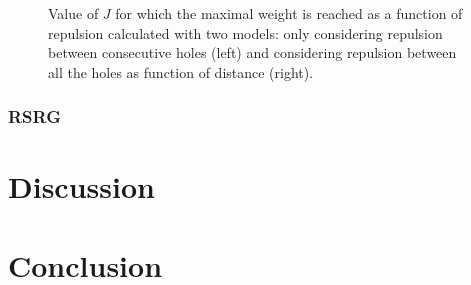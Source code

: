 \documentclass[12pt,twoside]{report}
\begin{document}
\begin{figure}[h!]
\begin{minipage}{0.4\textwidth}
		\end{minipage}
		\caption{\label{fig:} Value of $J$ for which the maximal weight is reached as a function of repulsion calculated with two models: only considering repulsion between consecutive holes (left) and considering repulsion between all the holes as function of distance (right). }
	\end{figure}
	\subsection{RSRG}
	
	\chapter{Discussion}
	
	\chapter{Conclusion}
\end{document}
